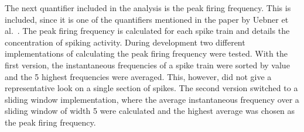 The next quantifier included in the analysis is the peak firing frequency. This is included, since it is one of the quantifiers mentioned in the paper by Uebner et al.~\cite{roberto}. The peak firing frequency is calculated for each spike train and details the concentration of spiking activity. During development two different implementations of calculating the peak firing frequency were tested. With the first version, the instantaneous frequencies of a spike train were sorted by value and the 5 highest frequencies were averaged. This, however, did not give a representative look on a single section of spikes. The second version switched to a sliding window implementation, where the average instantaneous frequency over a sliding window of width 5 were calculated and the highest average was chosen as the peak firing frequency.
\begin{comment}
At the request of my advisor I calculated the inter spike intervals(ISI) for the spike trains. This can give us a measure of the distribution of spikes in a spike train.\\
Going off of the ISI we can compute the linearity of the inter spike intervals in the form of R2. We want to know if the ISIs tend to increase as the spike trains last longer or decrease or if there is no significant impact. From the start we suspected that the intervals increase as the spike train goes on and calculating the R2 value should give us the confirmation.
\end{comment}



\cleardoublepage
